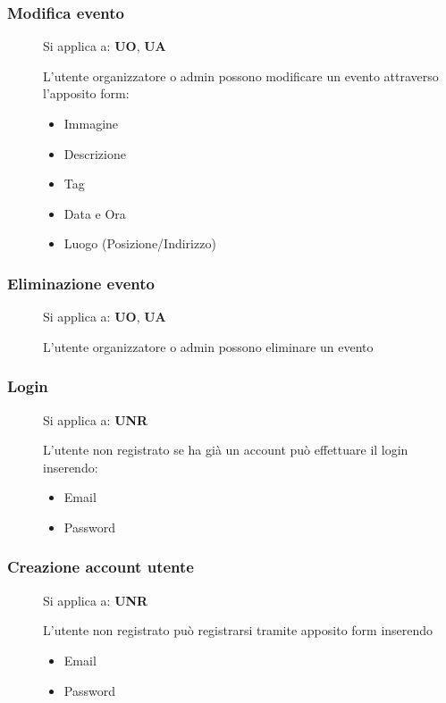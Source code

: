 \documentclass{article}
\begin{document}
\subsubsection{Modifica evento} \label{rf_6}
\begin{description}
    \item[] Si applica a: \textbf{UO}, \textbf{UA}
    \item[] L'utente organizzatore o admin possono modificare un evento attraverso l'apposito form:
        \begin{itemize}
            \item Immagine
            \item Descrizione
            \item Tag
            \item Data e Ora
            \item Luogo (Posizione/Indirizzo)
        \end{itemize}
\end{description}
\subsubsection{Eliminazione evento} \label{rf_7}
\begin{description}
    \item[] Si applica a: \textbf{UO}, \textbf{UA}
    \item[] L'utente organizzatore o admin possono eliminare un evento
\end{description}
\subsubsection{Login} \label{rf_8}
\begin{description}
    \item[] Si applica a: \textbf{UNR}
    \item[] L'utente non registrato se ha già un account può effettuare il login inserendo:
        \begin{itemize}
            \item Email
            \item Password
        \end{itemize}
\end{description}
\subsubsection{Creazione account utente} \label{rf_9}
\begin{description}
    \item[] Si applica a: \textbf{UNR}
    \item[] L'utente non registrato può registrarsi tramite apposito form inserendo
        \begin{itemize}
            \item Email
            \item Password
        \end{itemize}
\end{description}
\end{document}
